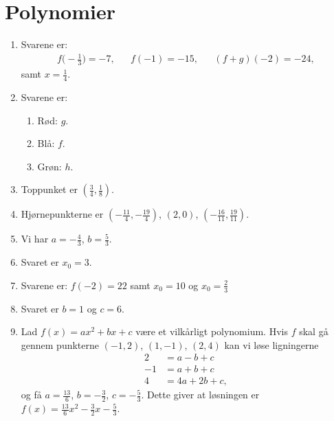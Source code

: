 \newpage
\section{Polynomier}
\begin{enumerate}
	\item Svarene er:
	\begin{align*}
	f\Big(-\frac{1}{3}\Big)=-7,&&f(-1)=-15,&& (f+g)(-2)=-24,
	\end{align*} 
	samt $x=\frac{1}{4}$.
	
	\item \label{it:poly1} Svarene er:
	\begin{enumerate}
		\item Rød: $g$.
		\item Blå: $f$.
		\item Grøn: $h$.
	\end{enumerate}
	
	\item Toppunket er $ (\frac{3}{4},\frac{1}{8}) $.
	
	\item Hjørnepunkterne er $(-\frac{11}{4},-\frac{19}{4})$, $ (2,0) $, $ (-\frac{16}{11},\frac{19}{11}) $.
	
	\item Vi har $a=-\frac{4}{3}$, $ b=\frac{5}{3} $.
	
	\item Svaret er $ x_0=3 $.
	
	\item Svarene er: $ f(-2)=22 $ samt $x_0=10$ og $x_0=\frac{2}{3}$
	
	\item Svaret er $b=1$ og $c=6$.
	
	\item Lad $f(x)=ax^2+bx+c$ være et vilkårligt polynomium. Hvis $f$ skal gå gennem punkterne $(-1,2)$, $(1,-1)$, $(2,4)$ kan vi løse ligningerne
	\begin{align*}
	2&=a-b+c\\
	-1&=a+b+c\\
	4&=4a+2b+c,
	\end{align*}
	og få $ a=\frac{13}{6} $, $ b=-\frac{3}{2} $, $ c=-\frac{5}{3} $. Dette giver at løsningen er $ f(x)=\frac{13}{6}x^2-\frac{3}{2}x-\frac{5}{3} $.
	

\end{enumerate}

